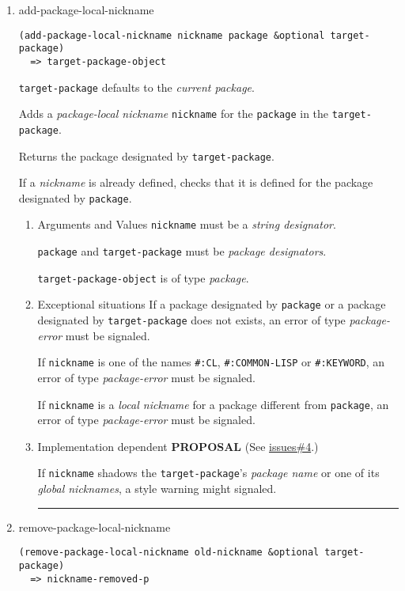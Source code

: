 \documentclass[11pt]{article}
\begin{document}
\begin{enumerate}
\begin{enumerate}
\noindent\rule{\textwidth}{0.5pt}
\end{enumerate}
\item add-package-local-nickname
\label{sec:orgc14b626}
\begin{verbatim}
(add-package-local-nickname nickname package &optional target-package)
  => target-package-object
\end{verbatim}

\texttt{target-package} defaults to the \emph{current package}.

Adds a \emph{package-local nickname} \texttt{nickname} for the \texttt{package} in the
\texttt{target-package}.

Returns the package designated by \texttt{target-package}.

If a \emph{nickname} is already defined, checks that it is defined for the
package designated by \texttt{package}.
\begin{enumerate}
\item Arguments and Values
\label{sec:org654a4e5}
\texttt{nickname} must be a \emph{string designator}.

\texttt{package} and \texttt{target-package} must be \emph{package designators}.

\texttt{target-package-object} is of type \emph{package}.
\item Exceptional situations
\label{sec:orga16d53b}
If a package designated by \texttt{package} or a package designated by
\texttt{target-package} does not exists, an error of type \emph{package-error} must be
signaled.

If \texttt{nickname} is one of the names \texttt{\#:CL}, \texttt{\#:COMMON-LISP} or \texttt{\#:KEYWORD},
an error of type \emph{package-error} must be signaled.

If \texttt{nickname} is a \emph{local nickname} for a package different from
\texttt{package}, an error of type \emph{package-error} must be signaled.
\item Implementation dependent
\label{sec:orgefaeb4c}
\textbf{PROPOSAL} (See \hyperref[sec:org2a5baa8]{issues\#4}.)

If \texttt{nickname} shadows the \texttt{target-package}'s \emph{package name} or one of its
\emph{global nicknames}, a style warning might signaled.

\noindent\rule{\textwidth}{0.5pt}
\end{enumerate}
\item remove-package-local-nickname
\label{sec:org1566f76}
\begin{verbatim}
(remove-package-local-nickname old-nickname &optional target-package)
  => nickname-removed-p
\end{verbatim}


\end{enumerate}
\end{document}
